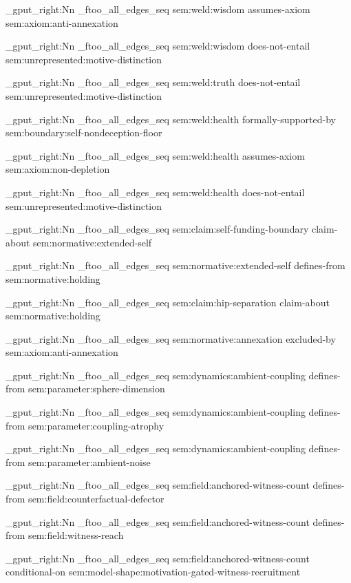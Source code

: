 \seq_gput_right:Nn \g_ftoo_all_edges_seq { { sem:weld:wisdom } { assumes-axiom } { sem:axiom:anti-annexation } }

\seq_gput_right:Nn \g_ftoo_all_edges_seq { { sem:weld:wisdom } { does-not-entail } { sem:unrepresented:motive-distinction } }

\seq_gput_right:Nn \g_ftoo_all_edges_seq { { sem:weld:truth } { does-not-entail } { sem:unrepresented:motive-distinction } }

\seq_gput_right:Nn \g_ftoo_all_edges_seq { { sem:weld:health } { formally-supported-by } { sem:boundary:self-nondeception-floor } }

\seq_gput_right:Nn \g_ftoo_all_edges_seq { { sem:weld:health } { assumes-axiom } { sem:axiom:non-depletion } }

\seq_gput_right:Nn \g_ftoo_all_edges_seq { { sem:weld:health } { does-not-entail } { sem:unrepresented:motive-distinction } }

\seq_gput_right:Nn \g_ftoo_all_edges_seq { { sem:claim:self-funding-boundary } { claim-about } { sem:normative:extended-self } }

\seq_gput_right:Nn \g_ftoo_all_edges_seq { { sem:normative:extended-self } { defines-from } { sem:normative:holding } }

\seq_gput_right:Nn \g_ftoo_all_edges_seq { { sem:claim:hip-separation } { claim-about } { sem:normative:holding } }

\seq_gput_right:Nn \g_ftoo_all_edges_seq { { sem:normative:annexation } { excluded-by } { sem:axiom:anti-annexation } }

\seq_gput_right:Nn \g_ftoo_all_edges_seq { { sem:dynamics:ambient-coupling } { defines-from } { sem:parameter:sphere-dimension } }

\seq_gput_right:Nn \g_ftoo_all_edges_seq { { sem:dynamics:ambient-coupling } { defines-from } { sem:parameter:coupling-atrophy } }

\seq_gput_right:Nn \g_ftoo_all_edges_seq { { sem:dynamics:ambient-coupling } { defines-from } { sem:parameter:ambient-noise } }

\seq_gput_right:Nn \g_ftoo_all_edges_seq { { sem:field:anchored-witness-count } { defines-from } { sem:field:counterfactual-defector } }

\seq_gput_right:Nn \g_ftoo_all_edges_seq { { sem:field:anchored-witness-count } { defines-from } { sem:field:witness-reach } }

\seq_gput_right:Nn \g_ftoo_all_edges_seq { { sem:field:anchored-witness-count } { conditional-on } { sem:model-shape:motivation-gated-witness-recruitment } }

